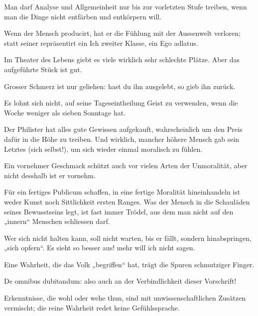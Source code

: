 Man darf Analyse und Allgemeinheit nur bis zur vorletzten Stufe treiben, wenn man die Dinge nicht entfärben und entkörpern will.
\par

Wenn der Mensch producirt, hat er die Fühlung mit der Aussenwelt verloren; statt seiner repräsentirt ein Ich zweiter Klasse, ein Ego adlatus.
\par

Im Theater des Lebens giebt es viele wirklich sehr schlechte Plätze. Aber das aufgeführte Stück ist gut.
\par

Grosser Schmerz ist nur geliehen: hast du ihn ausgelebt, so gieb ihn zurück.
\par

Es lohnt sich nicht, auf seine Tageseintheilung Geist zu verwenden, wenn die Woche weniger als sieben Sonntage hat.
\par

Der Philister hat alles gute Gewissen aufgekauft, wahrscheinlich um den Preis dafür in die Höhe zu treiben. Und wirklich, mancher höhere Mensch gab sein Letztes (sich selbst!), um sich wieder einmal moralisch zu fühlen.
\par

Ein vornehmer Geschmack schützt auch vor vielen Arten der Unmoralität, aber nicht desshalb ist er vornehm.
\par

Für ein fertiges Publicum schaffen, in eine fertige Moralität hineinhandeln ist weder Kunst noch Sittlichkeit ersten Ranges. Was der Mensch in die Schauläden seines Bewusstseins legt, ist fast immer Trödel, aus dem man nicht auf den „innern“ Menschen schliessen darf.
\par

Wer sich nicht halten kann, soll nicht warten, bis er fällt, sondern hinabspringen, „sich opfern“. Es sieht so besser aus! mehr will ich nicht sagen.
\par

Eine Wahrheit, die das Volk „begriffen“ hat, trägt die Spuren schmutziger Finger.
\par

De omnibus dubitandum: also auch an der Verbindlichkeit dieser Vorschrift!
\par

Erkenntnisse, die wohl oder wehe thun, sind mit unwissenschaftlichen Zusätzen vermischt; die reine Wahrheit redet keine Gefühlssprache.
\par

